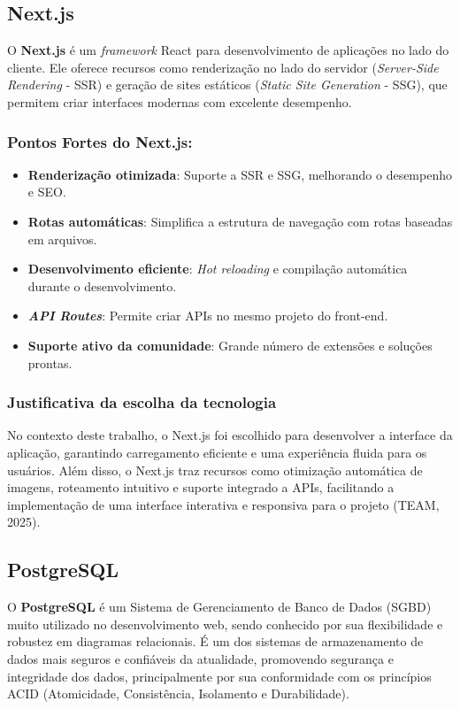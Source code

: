 \subsection{Next.js}

O \textbf{Next.js} é um \textit{framework} React para desenvolvimento de aplicações no lado do cliente. Ele oferece recursos como renderização no lado do servidor (\textit{Server-Side Rendering} - SSR) e geração de sites estáticos (\textit{Static Site Generation} - SSG), que permitem criar interfaces modernas com excelente desempenho.

\subsubsection*{Pontos Fortes do Next.js:}
\begin{itemize}
    \item \textbf{Renderização otimizada}: Suporte a SSR e SSG, melhorando o desempenho e SEO.
    \item \textbf{Rotas automáticas}: Simplifica a estrutura de navegação com rotas baseadas em arquivos.
    \item \textbf{Desenvolvimento eficiente}: \textit{Hot reloading} e compilação automática durante o desenvolvimento.
    \item \textbf{\textit{API Routes}}: Permite criar APIs no mesmo projeto do front-end.
    \item \textbf{Suporte ativo da comunidade}: Grande número de extensões e soluções prontas.
\end{itemize}

\subsubsection{Justificativa da escolha da tecnologia}
No contexto deste trabalho, o Next.js foi escolhido para desenvolver a interface da aplicação, garantindo carregamento eficiente e uma experiência fluida para os usuários. Além disso, o Next.js traz recursos como otimização automática de imagens, roteamento intuitivo e suporte integrado a APIs, facilitando a implementação de uma interface interativa e responsiva para o projeto (TEAM, 2025). 

\subsection{PostgreSQL}

O \textbf{PostgreSQL} é um Sistema de Gerenciamento de Banco de Dados (SGBD) muito utilizado no desenvolvimento web, sendo conhecido por sua flexibilidade e robustez em diagramas relacionais. É um dos sistemas de armazenamento de dados mais seguros e confiáveis da atualidade, promovendo segurança e integridade dos dados, principalmente por sua conformidade com os princípios ACID (Atomicidade, Consistência, Isolamento e Durabilidade). 

